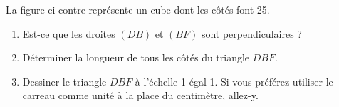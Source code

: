
\begin{exercice}\label{exoSeconde-0094}

    \begin{minipage}{0.485\textwidth}

        La figure ci-contre représente un cube dont les côtés font \unit{25}{\meter}. 
        \begin{enumerate}
            \item
        Est-ce que les droites \( (DB)\) et \( (BF)\) sont perpendiculaires ?
    \item
        Déterminer la longueur de tous les côtés du triangle \( DBF\).
    \item
        Dessiner le triangle \( DBF\) à l'échelle \unit{1}{\centi\meter} égal \unit{1}{\meter}. Si vous préférez utiliser le carreau comme unité à la place du centimètre, allez-y.
        \end{enumerate}
        
    \end{minipage}
    \hspace{1mm}
    \begin{minipage}{0.485\textwidth}
        \begin{center}

        \end{center}
    \end{minipage}

\end{exercice}
